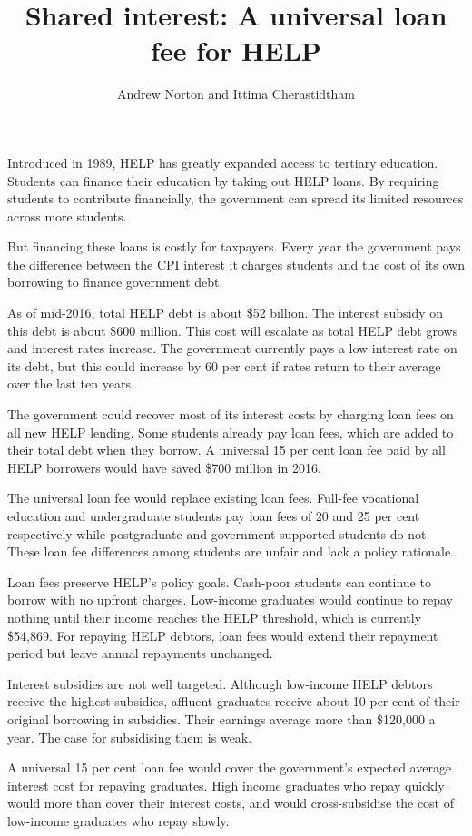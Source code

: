 \documentclass[embargoed]{grattan}
\title{Shared interest: A universal loan fee for HELP}
\author{Andrew Norton and Ittima Cherastidtham}
\begin{document}
\begin{overview}
Introduced in 1989, HELP has greatly expanded access to tertiary education. Students can finance their education by taking out HELP loans. By requiring students to contribute financially, the government can spread its limited resources across more students.

But financing these loans is costly for taxpayers. Every year the government pays the difference between the CPI interest it charges students and the cost of its own borrowing to finance government debt.

As of mid-2016, total HELP debt is about \$52 billion. The interest subsidy on this debt is about \$600 million. This cost will escalate as total HELP debt grows and interest rates increase. The government currently pays a low interest rate on its debt, but this could increase by 60 per cent if rates return to their average over the last ten years.

The government could recover most of its interest costs by charging loan fees on all new HELP lending. Some students already pay loan fees, which are added to their total debt when they borrow. A universal 15 per cent loan fee paid by all HELP borrowers would have saved \$700 million in 2016.

The universal loan fee would replace existing loan fees. Full-fee vocational education and undergraduate students pay loan fees of 20 and 25 per cent respectively while postgraduate and government-supported students do not. These loan fee differences among students are unfair and lack a policy rationale.

Loan fees preserve HELP's policy goals. Cash-poor students can continue to borrow with no upfront charges. Low-income graduates would continue to repay nothing until their income reaches the HELP threshold, which is currently \$54,869. For repaying HELP debtors, loan fees would extend their repayment period but leave annual repayments unchanged.

Interest subsidies are not well targeted. Although low-income HELP debtors receive the highest subsidies, affluent graduates receive about 10 per cent of their original borrowing in subsidies. Their earnings average more than \$120,000 a year. The case for subsidising them is weak.

A universal 15 per cent loan fee would cover the government's expected average interest cost for repaying graduates. High income graduates who repay quickly would more than cover their interest costs, and would cross-subsidise the cost of low-income graduates who repay slowly.


\end{overview}
\end{document}
